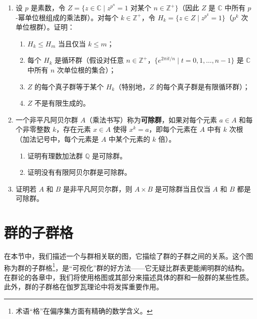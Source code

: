 \begin{enumerate}[label=\arabic*]
\item 设 \(p\) 是素数，令 \(Z = \{z \in \mathbb{C} \mid z^{p^n} = 1 \text{ 对某个 } n \in \mathbb{Z}^+\}\)（因此 \(Z\) 是 \(\mathbb{C}\) 中所有 \(p\)-幂单位根组成的乘法群）。对每个 \(k \in \mathbb{Z}^+\)，令 \(H_k = \{z \in Z \mid z^{p^k} = 1\}\)（\(p^k\) 次单位根群）。证明：
\begin{enumerate}[label=(\alph*)]
\item \(H_k \leq H_m\) 当且仅当 \(k \leq m\)；
\item 每个 \(H_k\) 是循环群（假设对任意 \(n \in \mathbb{Z}^+\)，\(\{e^{2\pi i t/n} \mid t = 0, 1, \ldots, n-1\}\) 是 \(\mathbb{C}\) 中所有 \(n\) 次单位根的集合）；
\item \(Z\) 的每个真子群等于某个 \(H_k\)（特别地，\(Z\) 的每个真子群是有限循环群）；
\item \(Z\) 不是有限生成的。
\end{enumerate}

\item 一个非平凡阿贝尔群 \(A\)（乘法书写）称为\textbf{可除群}，如果对每个元素 \(a \in A\) 和每个非零整数 \(k\)，存在元素 \(x \in A\) 使得 \(x^k = a\)，即每个元素在 \(A\) 中有 \(k\) 次根（加法记号中，每个元素是 \(A\) 中某个元素的 \(k\) 倍）。
\begin{enumerate}[label=(\alph*)]
\item 证明有理数加法群 \(\mathbb{Q}\) 是可除群。
\item 证明没有有限阿贝尔群是可除群。
\end{enumerate}

\item 证明若 \(A\) 和 \(B\) 是非平凡阿贝尔群，则 \(A \times B\) 是可除群当且仅当 \(A\) 和 \(B\) 都是可除群。
\end{enumerate}


\section{群的子群格}

在本节中，我们描述一个与群相关联的图，它描绘了群的子群之间的关系。这个图称为群的子群格\footnote{术语“格”在偏序集方面有精确的数学含义。}，是“可视化”群的好方法——它无疑比群表更能阐明群的结构。在群论的各章中，我们将使用格图或其部分来描述具体的群和一般群的某些性质。此外，群的子群格在伽罗瓦理论中将发挥重要作用。

